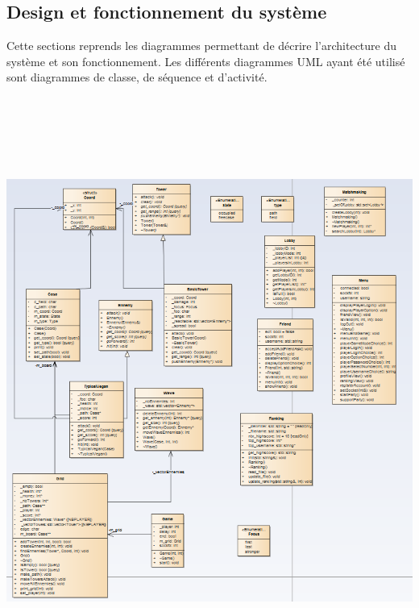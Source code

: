 \documentclass[10pt,a4paper]{article}
\begin{document}
\subsection{Design et fonctionnement du système}
Cette sections reprends les diagrammes permettant de décrire l'architecture du système et son fonctionnement. Les différents diagrammes UML ayant été utilisé sont diagrammes de classe, de séquence et d'activité.
  \includegraphics[height=20cm,width=20cm]{classe_diagramme.PNG}
\newpage
\end{document}
